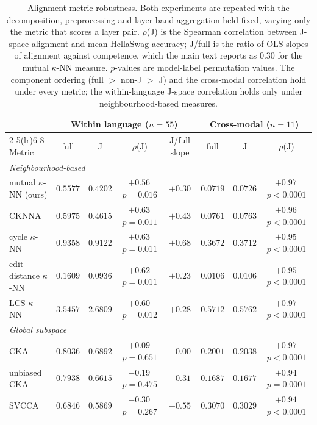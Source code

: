 \begin{table}[h]
  \centering
  \small
  \setlength{\tabcolsep}{4pt}
  \caption{Alignment-metric robustness. Both experiments are repeated with the decomposition, preprocessing and layer-band aggregation held fixed, varying only the metric that scores a layer pair. $\rho$(J) is the Spearman correlation between J-space alignment and mean HellaSwag accuracy; J/full is the ratio of OLS slopes of alignment against competence, which the main text reports as $0.30$ for the mutual $\kappa$-NN measure. $p$-values are model-label permutation values. The component ordering (full $>$ non-J $>$ J) and the cross-modal correlation hold under every metric; the within-language J-space correlation holds only under neighbourhood-based measures.}
  \label{tab:metricsweep}
  \begin{tabular}{lccccccc}
    \toprule
    & \multicolumn{4}{c}{Within language ($n=55$)} & \multicolumn{3}{c}{Cross-modal ($n=11$)} \\
    \cmidrule(lr){2-5}\cmidrule(lr){6-8}
    Metric & full & J & $\rho$(J) & J/full slope & full & J & $\rho$(J) \\
    \midrule
    \multicolumn{8}{l}{\emph{Neighbourhood-based}} \\
    mutual $\kappa$-NN (ours) & $0.5577$ & $0.4202$ & $+0.56$\,{\tiny$p=0.016$} & $+0.30$ & $0.0719$ & $0.0726$ & $+0.97$\,{\tiny$p<0.0001$} \\
    CKNNA & $0.5975$ & $0.4615$ & $+0.63$\,{\tiny$p=0.011$} & $+0.43$ & $0.0761$ & $0.0763$ & $+0.96$\,{\tiny$p<0.0001$} \\
    cycle $\kappa$-NN & $0.9358$ & $0.9122$ & $+0.63$\,{\tiny$p=0.011$} & $+0.68$ & $0.3672$ & $0.3712$ & $+0.95$\,{\tiny$p<0.0001$} \\
    edit-distance $\kappa$-NN & $0.1609$ & $0.0936$ & $+0.62$\,{\tiny$p=0.011$} & $+0.23$ & $0.0106$ & $0.0106$ & $+0.95$\,{\tiny$p<0.0001$} \\
    LCS $\kappa$-NN & $3.5457$ & $2.6809$ & $+0.60$\,{\tiny$p=0.012$} & $+0.28$ & $0.5712$ & $0.5762$ & $+0.97$\,{\tiny$p<0.0001$} \\
    \midrule
    \multicolumn{8}{l}{\emph{Global subspace}} \\
    CKA & $0.8036$ & $0.6892$ & $+0.09$\,{\tiny$p=0.651$} & $-0.00$ & $0.2001$ & $0.2038$ & $+0.97$\,{\tiny$p<0.0001$} \\
    unbiased CKA & $0.7938$ & $0.6615$ & $-0.19$\,{\tiny$p=0.475$} & $-0.31$ & $0.1687$ & $0.1677$ & $+0.94$\,{\tiny$p=0.0001$} \\
    SVCCA & $0.6846$ & $0.5869$ & $-0.30$\,{\tiny$p=0.267$} & $-0.55$ & $0.3070$ & $0.3029$ & $+0.94$\,{\tiny$p<0.0001$} \\
    \bottomrule
  \end{tabular}
\end{table}
